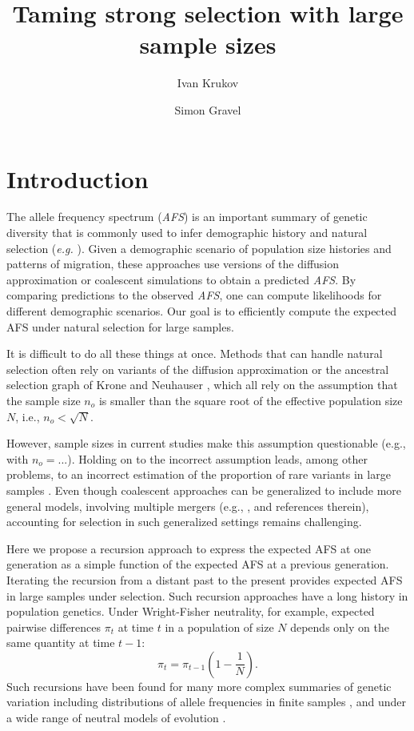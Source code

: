 \documentclass[9pt,twocolumn,twoside,lineno]{gsajnl}
\title{ Taming strong selection with large sample sizes }
\author[$\ast$]{Ivan Krukov}
\author[$\ast$]{Simon Gravel}
\affil[$\ast$]{Genome Center, Department of Human Genetics, McGill University, Montreal, Canada}
\begin{document}
\maketitle
\thispagestyle{firststyle}
\marginmark
\firstpagefootnote

\section{Introduction}
\label{sec_introduciton}

The allele frequency spectrum (\textit{AFS}) is an important summary of genetic diversity that is
commonly used to infer demographic history and natural selection (\textit{e.g.}
\cite{GutenkunstEtAl2009, KammEtAl2017, JouganousEtAl2017}). Given a demographic scenario of
population size histories and patterns of migration, these approaches use versions of the diffusion
approximation or coalescent simulations to obtain a predicted \textit{AFS}. By comparing
predictions to the observed \textit{AFS}, one can compute likelihoods for different demographic
scenarios. Our goal is to efficiently compute the expected AFS under natural selection for large samples.  

It is difficult to do all these things at once. Methods that can handle natural selection often rely on variants of the diffusion approximation  \citep{EyreWalker2006, BoykoEtAl2008, GutenkunstEtAl2009, JouganousEtAl2017} or the ancestral selection graph of Krone and Neuhauser \cite{Krone1997}, which all rely on the assumption that the sample size $n_o$ is smaller than the square root of the effective population size $N$, i.e., $n_o < \sqrt{N}.$  

However, sample sizes in current studies make this assumption questionable (e.g., \citep{karczewski2020mutational} with $n_o=...$). Holding on to the incorrect assumption leads, among other problems, to an incorrect estimation of the proportion of rare variants in large samples \citep{Fu2006, BhaskarEtAl2014}. 
Even though coalescent approaches can be generalized to include more general models, involving multiple mergers (e.g., \cite{Fu2006, Spence2016}, and references therein), accounting for selection in such generalized settings remains challenging.

Here we propose a recursion approach to express the expected AFS at one generation as a simple function of the expected AFS at a previous generation. Iterating the recursion from a distant past to the present provides expected AFS in large samples under selection. Such recursion approaches have a long history in population genetics. Under Wright-Fisher neutrality, for example, expected pairwise differences $\pi_t$ at time $t$ in a population of size $N$ depends only on the same quantity at time $t-1$: 
$$\pi_t = \pi_{t-1} \left(1-\frac{1}{N}\right).$$ 
Such recursions have been found for many more complex summaries of genetic variation including distributions of allele frequencies in finite samples \cite{JouganousEtAl2017, others}, and under a wide range of neutral models of evolution \cite{Lessard2010}. 
\end{document}
